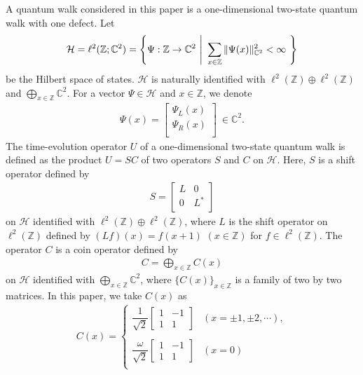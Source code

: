 \documentclass[a4paper,12pt]{article}
\theoremstyle{plain}
\theoremstyle{definition}
\theoremstyle{definition}
\begin{document}
A quantum walk considered in this paper is a one-dimensional two-state quantum walk with one defect.
Let
\begin{eqnarray}
\mathcal{H} =\ell ^2(\mathbb{Z} ;\mathbb{C} ^2)=\Biggl\{ \Psi : \mathbb{Z} \to \mathbb{C} ^2  ~\Bigg{|}~ %
\sum_{x \in \mathbb{Z}} \Arrowvert \Psi (x)\Arrowvert ^2 _{\mathbb{C}^2} <\infty \ \Biggr\} \nonumber
\end{eqnarray}
be the Hilbert space of states. $\mathcal{H}$ is naturally identified with $\ell^2 (\mathbb{Z})\oplus \ell^2 (\mathbb{Z})$ and $\bigoplus _{x \in \mathbb{Z}}\mathbb{C}^2$. For a vector $\Psi \in \mathcal{H}$ and $x \in \mathbb{Z}$, we denote
\begin{eqnarray}
\Psi(x)= \left[	
  \begin{array}{cc}
  \Psi _{L}(x)  \\
  \Psi _{R}(x)  \\ 
  \end{array}
  \right]\ \in \mathbb{C}^2. \nonumber
\end{eqnarray}
The time-evolution operator $U$ of a one-dimensional two-state quantum walk is defined as the product $U=SC$ of two operators $S$ and $C$ on $\mathcal{H}$. Here, $S$ is a shift operator defined by
\begin{eqnarray}
S=\left[	
  \begin{array}{cc}
  L &0 \\
   0 & L^*\\ 
  \end{array}
  \right] \nonumber
  \end{eqnarray}
on $\mathcal{H}$ identified with $\ell^2(\mathbb{Z}) \oplus \ell^2(\mathbb{Z})$, where $L$ is the shift operator on $\ell^2(\mathbb{Z})$ defined by $(Lf)(x)=f(x+1)$ $(x\in \mathbb{Z})$ for $f\in \ell^2(\mathbb{Z})$. The operator $C$ is a coin operator defined by 
\begin{eqnarray}
C= \bigoplus_{x \in \mathbb{Z}}C(x)\nonumber
  \end{eqnarray}
on $\mathcal{H}$ identified with $\bigoplus _{x \in \mathbb{Z}}\mathbb{C}^2$, where $\{C(x)\}_{x\in \mathbb{Z}}$ is a family of two by two matrices. In this paper, we take $C(x)$ as
\begin{eqnarray}
C(x)=\left\{ \begin{array}{ll}
\dfrac{1}{\sqrt{2}}\begin{bmatrix} 1&-1\\ 1& 1\end{bmatrix}& (x=\pm1,\pm2,\cdots), \\\\
\dfrac{\omega}{\sqrt{2}}\begin{bmatrix} 1&-1\\ 1& 1\end{bmatrix}& (x=0) \\
\end{array} \right. \nonumber
\end{eqnarray}
\end{document}
